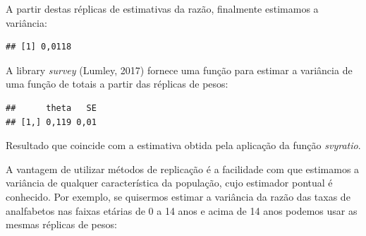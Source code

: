 \documentclass[
  12pt,
  brazilian,
]{book}
\newenvironment{Shaded}{\begin{snugshade}}{\end{snugshade}}
\newcommand{\ControlFlowTok}[1]{\textcolor[rgb]{0.13,0.29,0.53}{\textbf{#1}}}
\newcommand{\DecValTok}[1]{\textcolor[rgb]{0.00,0.00,0.81}{#1}}
\newcommand{\FunctionTok}[1]{\textcolor[rgb]{0.00,0.00,0.00}{#1}}
\newcommand{\NormalTok}[1]{#1}
\newcommand{\OtherTok}[1]{\textcolor[rgb]{0.56,0.35,0.01}{#1}}
\newcommand{\SpecialCharTok}[1]{\textcolor[rgb]{0.00,0.00,0.00}{#1}}
\theoremstyle{definition}
\theoremstyle{definition}
\theoremstyle{definition}
\theoremstyle{definition}
\theoremstyle{remark}
\begin{document}
A partir destas réplicas de estimativas da razão, finalmente estimamos a variância:

\begin{Shaded}
\end{Shaded}

\begin{verbatim}
## [1] 0,0118
\end{verbatim}

A library \emph{survey} (Lumley, 2017) fornece uma função para estimar a variância de uma função de totais a partir das réplicas de pesos:

\begin{Shaded}
\end{Shaded}

\begin{verbatim}
##      theta   SE
## [1,] 0,119 0,01
\end{verbatim}

Resultado que coincide com a estimativa obtida pela aplicação da função \emph{svyratio}.

A vantagem de utilizar métodos de replicação é a facilidade com que estimamos a variância de qualquer
característica da população, cujo estimador pontual é conhecido. Por exemplo, se quisermos estimar a variância da razão das taxas de analfabetos nas faixas etárias de 0 a 14 anos e acima de 14 anos podemos usar as mesmas réplicas de pesos:
\end{document}
